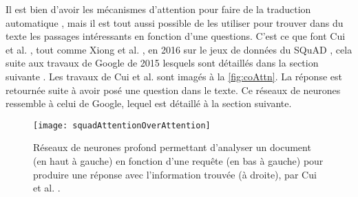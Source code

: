Il est bien d'avoir les mécanismes d'attention pour faire de la traduction automatique \cite{attentionMechanism}, mais il est tout aussi possible de les utiliser pour trouver dans du texte les passages intéressants en fonction d'une questions. C'est ce que font Cui et al. \cite{squad:attentionOverAttention}, tout comme Xiong et al. \cite{squad:coattention}, en 2016 sur le jeux de données du SQuAD \cite{squad}, cela suite aux travaux de Google de 2015 lesquels sont détaillés dans la section suivante \cite{readNcomprehend}. Les travaux de Cui et al. sont imagés à la \autoref{fig:coAttn}. La réponse est retournée suite à avoir posé une question dans le texte. Ce réseaux de neurones ressemble à celui de Google, lequel est détaillé à la section suivante. 

\begin{figure*}
  \centering
  \texttt{[image: squadAttentionOverAttention]}
  \caption{Réseaux de neurones profond permettant d'analyser un document (en haut à gauche) en fonction d'une requête (en bas à gauche) pour produire une réponse avec l'information trouvée (à droite), par Cui et al. \cite{squad:attentionOverAttention}.}
  \label{fig:coAttn}
\end{figure*}
